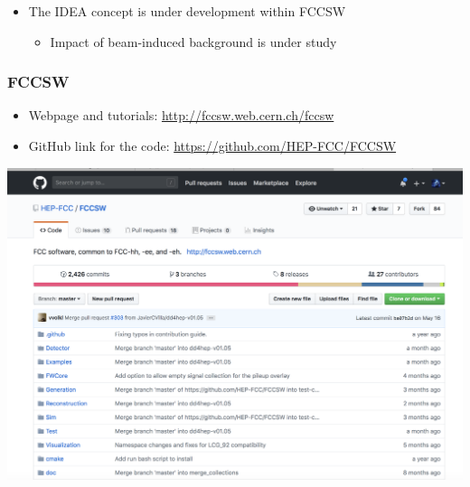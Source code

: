 \documentclass[hyperref={colorlinks=true,pdfpagelabels=false,linkcolor=black}, xcolor=dvipsnames,10pt]{beamer}
\begin{document}
\begin{frame}
  \vspace{0.5cm}
  \begin{itemize}
    \item The IDEA concept is under development within FCCSW
      \begin{itemize}
        \item Impact of beam-induced background is under study
      \end{itemize}
  \end{itemize}

\end{frame}

\begin{frame}
	\frametitle{FCCSW}

    \begin{itemize}
      \item Webpage and tutorials: \url{http://fccsw.web.cern.ch/fccsw}
      \item GitHub link for the code: \url{https://github.com/HEP-FCC/FCCSW}
    \end{itemize}

    \centering
		\includegraphics[width=\textwidth]{./figures/GitHub}
\end{frame}
\end{document}
